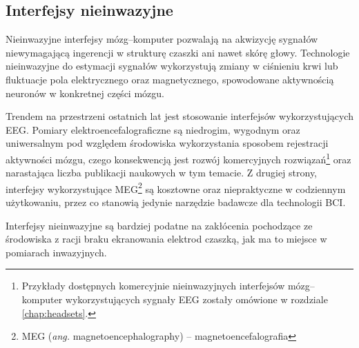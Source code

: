 \documentclass[skorowidz,skroty]{dyplomWEZUT}
\begin{document}
\subsection{Interfejsy nieinwazyjne}
Nieinwazyjne interfejsy mózg--komputer pozwalają na akwizycję sygnałów niewymagającą ingerencji w strukturę czaszki ani nawet skórę głowy. Technologie nieinwazyjne do estymacji sygnałów wykorzystują zmiany w ciśnieniu krwi lub fluktuacje pola elektrycznego oraz magnetycznego, spowodowane aktywnością neuronów w konkretnej części mózgu\cite{bci_introduction}.

Trendem na przestrzeni ostatnich lat jest stosowanie interfejsów wykorzystujących EEG. Pomiary elektroencefalograficzne są niedrogim, wygodnym oraz uniwersalnym pod względem środowiska wykorzystania sposobem rejestracji aktywności mózgu, czego konsekwencją jest rozwój komercyjnych rozwiązań\footnote{Przykłady dostępnych komercyjnie nieinwazyjnych interfejsów mózg--komputer wykorzystujących sygnały EEG zostały omówione w rozdziale \ref{chap:headsets}.} oraz narastająca liczba publikacji naukowych w tym temacie. Z drugiej strony, interfejsy wykorzystujące MEG\footnote{MEG (\textit{ang.} magnetoencephalography) -- magnetoencefalografia} są kosztowne oraz niepraktyczne w codziennym użytkowaniu, przez co stanowią jedynie narzędzie badawcze dla technologii BCI\cite{bci_principles}.

Interfejsy nieinwazyjne są bardziej podatne na zakłócenia pochodzące ze środowiska z racji braku ekranowania elektrod czaszką, jak ma to miejsce w pomiarach inwazyjnych.
\end{document}
